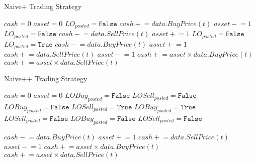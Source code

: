 \documentclass[12pt]{article}
\newcommand{\pluseq}{\mathrel{+}=}
\newcommand{\mineq}{\mathrel{-}=}
\begin{document}
\begin{algorithm}
\caption{Naive+ Trading Strategy}
\begin{algorithmic}[1]
\State $cash = 0$
\State $asset = 0$
\State $LO_{posted} = \texttt{False}$
		\State $cash \pluseq data.BuyPrice(\textit{t})$
		\State $asset \mineq 1$
		\State $LO_{posted} = \texttt{False}$
		\State $cash \mineq data.SellPrice(\textit{t})$	
		\State $asset \pluseq 1$
		\State $LO_{posted} = \texttt{False}$
		\State $LO_{posted} = \texttt{True}$
	\EndIf
				\State $cash \mineq data.BuyPrice(\textit{t})$	
				\State $asset \pluseq 1$
				\State $cash \pluseq data.SellPrice(\textit{t})$
				\State $asset \mineq 1$
			\EndIf
		\EndFor
	\EndIf
\EndFor
{} 
\State $cash \pluseq asset \times data.BuyPrice(\textit{t})$
\State $cash \pluseq asset \times data.SellPrice(\textit{t})$	
\EndIf
\end{algorithmic}
\end{algorithm}

\begin{algorithm}
\caption{Naive++ Trading Strategy}
\begin{algorithmic}[1]
\State $cash = 0$
\State $asset = 0$
\State $LOBuy_{posted} = \texttt{False}$
\State $LOSell_{posted} = \texttt{False}$
		\State $LOBuy_{posted} = \texttt{False}$
		\State $LOSell_{posted} = \texttt{True}$
		\State $LOBuy_{posted} = \texttt{True}$
		\State $LOSell_{posted} = \texttt{False}$
		\State $LOBuy_{posted} = \texttt{False}$
		\State $LOSell_{posted} = \texttt{False}$
	\EndIf

			\State $cash \mineq data.BuyPrice(\textit{t})$	
			\State $asset \pluseq 1$
			\State $cash \pluseq data.SellPrice(\textit{t})$
			\State $asset \mineq 1$
		\EndIf
	\EndFor
\EndFor
{} 
\State $cash \pluseq asset \times data.BuyPrice(\textit{t})$
\State $cash \pluseq asset \times data.SellPrice(\textit{t})$	
\EndIf
\end{algorithmic}
\end{algorithm}
\end{document}
